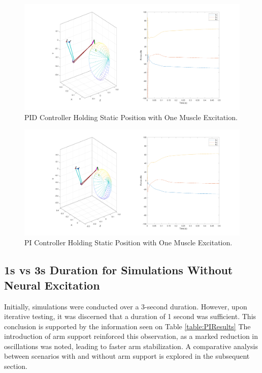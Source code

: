 \begin{figure}[h!]
    \centering

   \includegraphics[width=0.8\linewidth]{Pictures/Results/PIDController_NeuralExcitation.png}
    \caption{PID Controller Holding Static Position with One Muscle Excitation.}
\end{figure}

\begin{figure}[h!]  
    \centering

    \includegraphics[width=0.8\linewidth]{Pictures/Results/PIController_NeuralExcitation.png}
    \caption{PI Controller Holding Static Position with One Muscle Excitation.}
\end{figure}



\newpage
\subsection{1s vs 3s Duration for Simulations Without Neural Excitation}

Initially, simulations were conducted over a 3-second duration. However, upon iterative testing, it was discerned that a duration of 1 second was sufficient. This conclusion is supported by the information seen on Table \ref{table:PIResults} The introduction of arm support reinforced this observation, as a marked reduction in oscillations was noted, leading to faster arm stabilization. A comparative analysis between scenarios with and without arm support is explored in the subsequent section.

